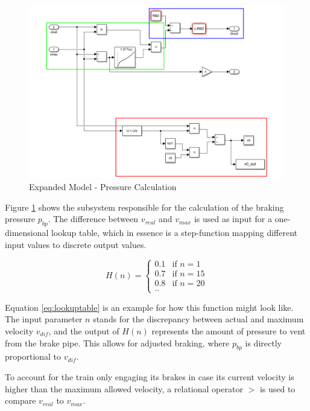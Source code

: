 \begin{figure}[htb!]
	\centering
	\includegraphics[width=\linewidth]{./pic/expandedmodel_pressure}
	\caption{Expanded Model - Pressure Calculation}
	\label{fig:expandedmodel_pressure}
\end{figure}

\par\noindent
Figure \ref{fig:expandedmodel_pressure} shows the subsystem responsible for the calculation of the braking pressure $p_{bp}$. The difference between $v_{real}$ and $v_{max}$ is used as input for a one-dimensional lookup table, which in essence is a step-function mapping different input values to discrete output values. 

\begin{equation}
\label{eq:lookuptable}
H(n) =
\begin{cases}
0.1 & \text{if $n=1$} \\
0.7 & \text{if $n=15$} \\
0.8 & \text{if $n=20$} \\
\text{..}
\end{cases}
\end{equation}

\noindent
Equation \ref{eq:lookuptable} is an example for how this function might look like. The input parameter $n$ stands for the discrepancy between actual and maximum velocity $v_{dif}$, and the output of $H(n)$ represents the amount of pressure to vent from the brake pipe. This allows for adjusted braking, where $p_{bp}$ is directly proportional to $v_{dif}$.
\par
To account for the train only engaging its brakes in case its current velocity is higher than the maximum allowed velocity, a relational operator $>$ is used to compare $v_{real}$ to $v_{max}$.

